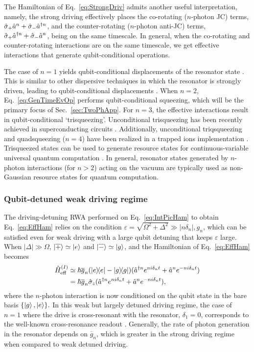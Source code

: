 The Hamiltonian of Eq.~\eqref{eq:StrongDriv} admits another useful interpretation, namely, the strong driving effectively places the co-rotating ($n$-photon JC) terms, $\hat{\sigma}_+\hat{a}^n+\hat{\sigma}_-\hat{a}^{\dagger n}$, and the counter-rotating ($n$-photon anti-JC) terms, $\hat{\sigma}_+\hat{a}^{\dagger n} +\hat{\sigma}_-\hat{a}^n$, being on the same timescale. In general, when the co-rotating and counter-rotating interactions are on the same timescale, we get effective interactions that generate qubit-conditional operations.

The case of $n=1$ yields qubit-conditional displacements of the resonator state \cite{ResSchCats,SolanoCat}. This is similar to other dispersive techniques in which the resonator is strongly driven, leading to qubit-conditional displacements \cite{QECGrid2020,FastUnivControlDisp}.
When $n=2$, Eq.~\eqref{eq:GenTimeEvOp} performs qubit-conditional squeezing, which will be the primary focus of Sec.~\ref{sec:TwoPhApp}. For $n=3$, the effective interactions result in qubit-conditional `trisqueezing'. Unconditional trisqueezing has been recently achieved in superconducting circuits \cite{CWilson2,Trisq2}. Additionally, unconditional triqsqueezing and quadsqueezing ($n=4$) have been realized in a trapped ions implementation \cite{UncondSqTrappedIons}. Trisqueezed states can be used to generate resource states for continuous-variable universal quantum computation \cite{CubicPhase}. In general, resonator states generated by $n$-photon interactions (for $n>2$) acting on the vacuum are typically used as non-Gaussian resource states for quantum computation.

\subsubsection{Qubit-detuned weak driving regime}

The driving-detuning RWA performed on Eq.~\eqref{eq:IntPicHam} to obtain Eq.~\eqref{eq:EffHam} relies on the condition $\varepsilon=\sqrt{\Omega^2+ \Delta^2}\gg |n\delta_n|,g_n$, which can be satisfied even for weak driving with a large qubit detuning that keeps $\varepsilon$ large. When $|\Delta|\gg \Omega$, $\ket{\overline{+}}\simeq\ket{e}$ and $\ket{\overline{-}}\simeq\ket{g}$, and the Hamiltonian of Eq.~\eqref{eq:EffHam} becomes
\begin{align}\label{eq:DetEffHam}
\hat{H}^{(I)}_{\text{eff}}&\simeq\hbar \overline{g}_n (\dyad{e}-\dyad{g})(\hat{a}^{\dagger n} e^{ni\delta_n t}+\hat{a}^n e^{-ni\delta_n t})\nonumber\\ &= \hbar \overline{g}_n \sigZ (\hat{a}^{\dagger n} e^{ni\delta_n t}+\hat{a}^n e^{-ni\delta_n t}),
\end{align}
where the $n$-photon interaction is now conditioned on the qubit state in the bare basis $\{\ket{g},\ket{e}\}.$ In this weak but largely detuned driving regime, the case of $n=1$ where the drive is cross-resonant with the resonator, $\delta_1=0$, corresponds to the well-known cross-resonance readout \cite{GatedConditionalDisp}. Generally, the rate of photon generation in the resonator depends on $\overline{g}_n$, which is greater in the strong driving regime when compared to weak detuned driving.

